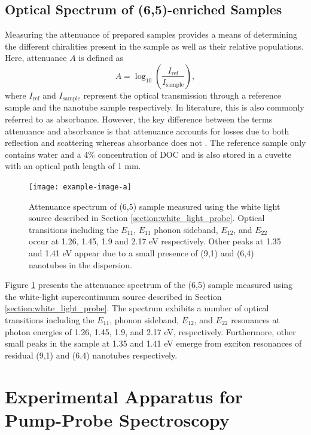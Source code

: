 \subsection{Optical Spectrum of (6,5)-enriched Samples}

Measuring the attenuance of prepared samples provides a means of determining the different chiralities present in the sample as well as their relative populations. Here, attenuance $A$ is defined as
\begin{equation}
A = \log_{10}\left(\dfrac{I_{\mathrm{ref}}}{I_{\mathrm{sample}}}\right),
\end{equation}
where $I_{\mathrm{ref}}$ and $I_{\mathrm{sample}}$ represent the optical transmission through a reference sample and the nanotube sample respectively. In literature, this is also commonly referred to as absorbance. However, the key difference between the terms attenuance and absorbance is that attenuance accounts for losses due to both reflection and scattering whereas absorbance does not \cite{dixon1992absorbance}. The reference sample only contains water and a 4\% concentration of DOC and is also stored in a cuvette with an optical path length of 1 mm.

\begin{figure}[H]
	\centering
	\texttt{[image: example-image-a]}
	\caption{ Attenuance spectrum of (6,5) sample measured using the white light source described in Section \ref{section:white_light_probe}. Optical transitions including the $E_{11}$, $E_{11} $ phonon sideband, $E_{12}$, and $E_{22}$ occur at 1.26, 1.45, 1.9 and 2.17 eV respectively. Other peaks at 1.35 and 1.41 eV appear due to a small presence of (9,1) and (6,4) nanotubes in the dispersion.}
	\label{fig:sample_absorbance}
\end{figure}


Figure \ref{fig:sample_absorbance} presents the attenuance spectrum of the (6,5) sample measured using the white-light supercontinuum source described in Section \ref{section:white_light_probe}. The spectrum exhibits a number of optical transitions including the $E_{11}$, phonon sideband, $E_{12}$, and $E_{22}$ resonances at photon energies of 1.26, 1.45, 1.9, and 2.17 eV, respectively. Furthermore, other small peaks in the sample at 1.35 and 1.41 eV emerge from exciton resonances of residual (9,1) and (6,4) nanotubes respectively.


\section{Experimental Apparatus for Pump-Probe Spectroscopy}

